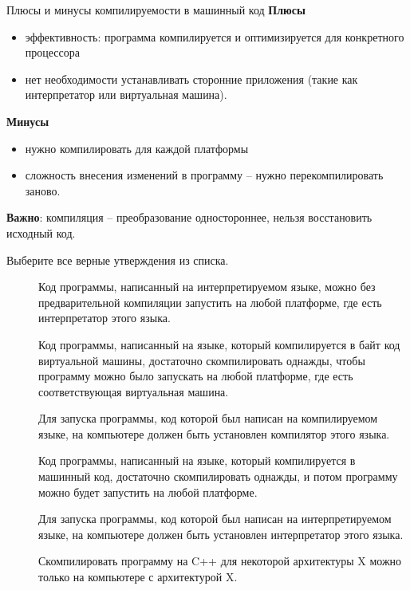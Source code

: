 \documentclass[9pt]{beamer}
\begin{document}
\begin{frame}{Плюсы и минусы компилируемости в машинный код}
    \textbf{Плюсы}
    \begin{itemize}
        \item эффективность: программа компилируется и оптимизируется для конкретного процессора
        \item нет необходимости устанавливать сторонние приложения (такие как интерпретатор или виртуальная машина).
    \end{itemize}
    \textbf{Минусы}
    \begin{itemize}
        \item нужно компилировать для каждой платформы
        \item сложность внесения изменений в программу -- нужно перекомпилировать заново.
    \end{itemize}
    \textbf{Важно}: компиляция -- преобразование одностороннее, нельзя восстановить исходный код.
\end{frame}

\begin{frame}
    Выберите все верные утверждения из списка.
    \begin{description}
        \item[\Square]  Код программы, написанный на интерпретируемом языке, можно без предварительной компиляции запустить на любой платформе, где есть интерпретатор этого языка.
        \item[\Square]  Код программы, написанный на языке, который компилируется в байт код виртуальной машины, достаточно скомпилировать однажды, чтобы программу можно было запускать на любой платформе, где есть соответствующая виртуальная машина.
        \item[\Square]  Для запуска программы, код которой был написан на компилируемом языке, на компьютере должен быть установлен компилятор этого языка.
        \item[\Square]  Код программы, написанный на языке, который компилируется в машинный код, достаточно скомпилировать однажды, и потом программу можно будет запустить на любой платформе.
        \item[\Square] Для запуска программы, код которой был написан на интерпретируемом языке, на компьютере должен быть установлен интерпретатор этого языка.
        \item[\Square] Скомпилировать программу на C++ для некоторой архитектуры X можно только на компьютере с архитектурой X.
    \end{description}
\end{frame}
\end{document}

